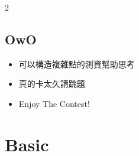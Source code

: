 \documentclass[a4paper,10pt,twocolumn,oneside,x11names]{article}
\begin{document}
\renewcommand{\headrulewidth}{0.4pt}
\renewcommand{\contentsname}{Contents} 

\pagestyle{fancy}
\fancyfoot{}
\fancyhead[R]{\thepage}


{\scriptsize
\begin{multicols}{2}
\tableofcontents
\end{multicols}}



\subsection{OwO}
\begin{itemize}[nolistsep]
\item 可以構造複雜點的測資幫助思考
\item 真的卡太久請跳題
\item Enjoy The Contest!
\end{itemize}


\section{Basic}

% 
\end{document}
